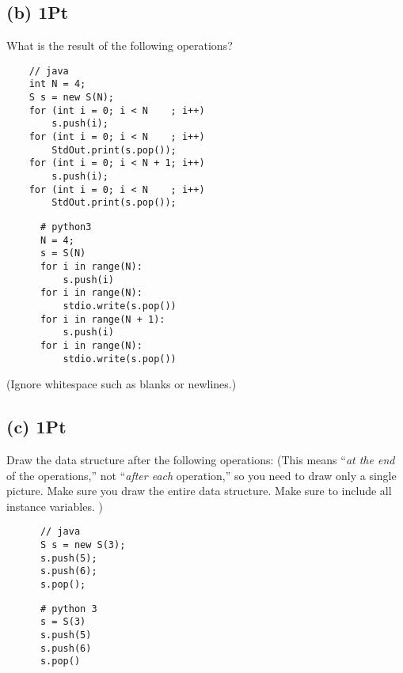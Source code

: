 \documentclass{tufte-handout}
\begin{document}
    \subsection*{(b) 1Pt}
      What is the result of the following operations?\\
      \begin{minipage}{7cm}
      \begin{verbatim}
	// java 
	int N = 4;	
	S s = new S(N);
	for (int i = 0; i < N    ; i++) 
	    s.push(i);
	for (int i = 0; i < N    ; i++) 
	    StdOut.print(s.pop());
	for (int i = 0; i < N + 1; i++) 
	    s.push(i);
	for (int i = 0; i < N    ; i++) 
	    StdOut.print(s.pop());
      \end{verbatim}
      \end{minipage}
%
      \begin{minipage}{7cm}
      \begin{verbatim}
      # python3
      N = 4;
      s = S(N)
      for i in range(N):
          s.push(i)
      for i in range(N):
          stdio.write(s.pop())
      for i in range(N + 1): 
          s.push(i)
      for i in range(N): 
          stdio.write(s.pop())
      \end{verbatim}
      \end{minipage}
       
      (Ignore whitespace such as blanks or newlines.)
    \subsection*{(c) 1Pt}      
      Draw the data structure after the following operations:
      (This means ``\emph{at the end} of the operations,''
        not ``\emph{after each} operation,''  so you need to draw only a single picture.
        Make sure you draw the entire data structure.
        Make sure to include all instance variables.
        )
      \begin{minipage}{5cm}
      \begin{verbatim}
      // java
      S s = new S(3);
      s.push(5);
      s.push(6);
      s.pop();
      \end{verbatim}
      \end{minipage}
%
      \begin{minipage}{5cm}
      \begin{verbatim}
      # python 3
      s = S(3)
      s.push(5)
      s.push(6)
      s.pop()
      \end{verbatim}
      \end{minipage}
\end{document}
